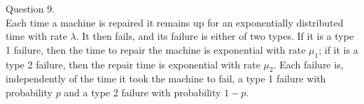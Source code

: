 \documentclass[answers,12pt,addpoints]{exam}
\begin{document}
\begin{questions}
    \question Question 9.\\
    Each time a machine is repaired it remains up for an exponentially distributed time with rate $\lambda$.
    It then fails, and its failure is either of two types. If it is a type 1 failure, then the time to repair
    the machine is exponential with rate $\mu_1$; if it is a type 2 failure, then the repair time is exponential
    with rate $\mu_2$. Each failure is, independently of the time it took the machine to fail, a type 1 failure
    with probability $p$ and a type 2 failure with probability $1 - p$.
\end{questions}
\end{document}
